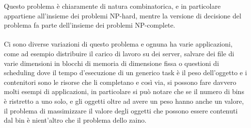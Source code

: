 \noindent
Questo problema è chiaramente di natura combinatorica, e in particolare appartiene all'insieme dei problemi NP-hard, mentre
la versione di decisione del problema fa parte dell'insieme dei problemi NP-complete.\\ \\
Ci sono diverse variazioni di questo problema e ognuna ha varie applicazioni, come ad esempio distribuire il carico di
lavoro su dei server, salvare dei file di varie dimensioni in blocchi di memoria di dimensione fissa o questioni di
scheduling dove il tempo d'esecuzione di un generico task è il peso dell'oggetto e i contenitori sono le risorse che li
completano e così via, si possono fare davvero molti esempi di applicazioni, in particolare si può notare che se il numero
di bins è ristretto a uno solo, e gli oggetti oltre ad avere un peso hanno anche un valore, il problema di massimizzare il
valore degli oggetti che possono essere contenuti dal bin è nient'altro che il problema dello zaino.